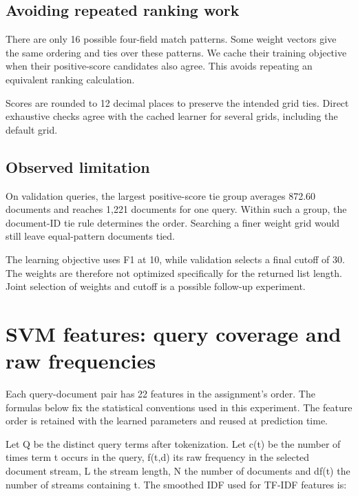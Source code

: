 \documentclass[12pt,a4paper]{article}
\begin{document}
\subsection{Avoiding repeated ranking work}
There are only 16 possible four-field match patterns. Some weight vectors give the same ordering and ties over these patterns. We cache their training objective when their positive-score candidates also agree. This avoids repeating an equivalent ranking calculation.

Scores are rounded to 12 decimal places to preserve the intended grid ties. Direct exhaustive checks agree with the cached learner for several grids, including the default grid.

\subsection{Observed limitation}
On validation queries, the largest positive-score tie group averages 872.60 documents and reaches 1,221 documents for one query. Within such a group, the document-ID tie rule determines the order. Searching a finer weight grid would still leave equal-pattern documents tied.

The learning objective uses F1 at 10, while validation selects a final cutoff of 30. The weights are therefore not optimized specifically for the returned list length. Joint selection of weights and cutoff is a possible follow-up experiment.

\section{SVM features: query coverage and raw frequencies}
Each query-document pair has 22 features in the assignment's order. The formulas below fix the statistical conventions used in this experiment. The feature order is retained with the learned parameters and reused at prediction time.

Let Q be the distinct query terms after tokenization. Let c(t) be the number of times term t occurs in the query, f(t,d) its raw frequency in the selected document stream, L the stream length, N the number of documents and df(t) the number of streams containing t. The smoothed IDF used for TF-IDF features is:
\end{document}

